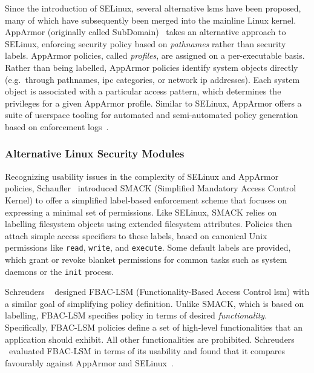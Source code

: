 Since the introduction of SELinux, several alternative \gls{lsm}s have been proposed, many
of which have subsequently been merged into the mainline Linux kernel. AppArmor
(originally called SubDomain)~\cite{cowan2000_apparmor} takes an alternative approach to
SELinux, enforcing security policy based on \textit{pathnames} rather than security
labels.  AppArmor policies, called \textit{profiles}, are assigned on a per-executable
basis. Rather than being labelled, AppArmor policies identify system objects directly
(e.g.~through pathnames, \gls{ipc} categories, or network \gls{ip} addresses). Each system
object is associated with a particular access pattern, which determines the privileges for
a given AppArmor profile. Similar to SELinux, AppArmor offers a suite of userspace tooling
for automated and semi-automated policy generation based on enforcement
logs~\cite{aa_easyprof, aa_genprof, aa_logprof}.

\subsubsection*{Alternative Linux Security Modules}

Recognizing usability issues in the complexity of SELinux and AppArmor policies,
Schaufler~\cite{schaufler_smack} introduced SMACK (Simplified Mandatory Access Control
Kernel) to offer a simplified label-based enforcement scheme that focuses on expressing
a minimal set of permissions. Like SELinux, SMACK relies on labelling filesystem objects
using extended filesystem attributes. Policies then attach simple access specifiers to
these labels, based on canonical Unix permissions like \texttt{read}, \texttt{write}, and
\texttt{execute}. Some default labels are provided, which grant or revoke blanket
permissions for common tasks such as system daemons or the \texttt{init} process.

Schreuders \etal~\cite{schreuders2012_towards} designed FBAC-LSM (Functionality-Based
Access Control \gls{lsm}) with a similar goal of simplifying policy definition. Unlike
SMACK, which is based on labelling, FBAC-LSM specifies policy in terms of desired
\textit{functionality}. Specifically, FBAC-LSM policies define a set of high-level
functionalities that an application should exhibit. All other functionalities are
prohibited. Schreuders \etal~evaluated FBAC-LSM in terms of its usability and found that
it compares favourably against AppArmor and SELinux~\cite{schreuders2012_towards}.

